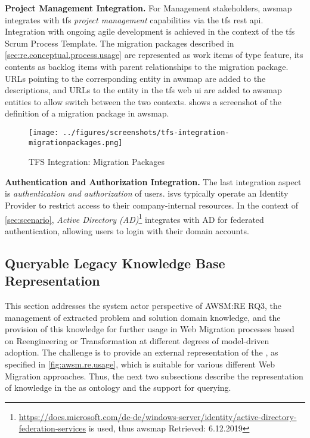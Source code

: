 \textbf{Project Management Integration.} For Management stakeholders, \gls{awsmap} integrates with \gls{tfs} \emph{project management} capabilities via the \gls{tfs} \gls{rest} \gls{api}.
Integration with ongoing agile development is achieved in the context of the \gls{tfs} Scrum Process Template.
The migration packages described in \cref{sec:re.conceptual.process.usage} are represented as work items of type feature, its contents as backlog items with parent relationships to the migration package.
URLs pointing to the corresponding entity in \gls{awsmap} are added to the descriptions, and URLs to the entity in the \gls{tfs} \gls{web} \gls{ui} are added to \gls{awsmap} entities to allow switch between the two contexts.
 shows a screenshot of the definition of a migration package in \gls{awsmap}.
\begin{figure}[h!]
\hypertarget{fig:tfs-integration}{%
\centering
\texttt{[image: ../figures/screenshots/tfs-integration-migrationpackages.png]}
\caption{TFS Integration: Migration Packages}\label{fig:tfs-integration}
}
\end{figure}

\textbf{Authentication and Authorization Integration.} The last integration aspect is \emph{authentication and authorization} of users.
\glspl{isv} typically operate an Identity Provider to restrict access to their company-internal resources.
In the context of \cref{sec:scenario}, \emph{Active Directory (AD)}\footnote{\url{https://docs.microsoft.com/de-de/windows-server/identity/active-directory-federation-services} is used, thus \gls{awsmap} Retrieved: 6.12.2019} integrates with AD for federated authentication, allowing users to login with their domain accounts.

\vspace{-10pt}
\hypertarget{sec:representation}{%
\subsection[Queryable Legacy Knowledge Base Repres.]{Queryable Legacy Knowledge Base Representation}\label{sec:representation}}
\vspace{10pt}

This section addresses the system actor perspective of AWSM:RE RQ3, the management of extracted problem and solution domain knowledge, and the provision of this knowledge for further usage in \gls{Web Migration} processes based on \gls{Reengineering} or \gls{Transformation} at different degrees of model-driven adoption.
The challenge is to provide an external representation of the \awsmknowledgebase, as specified in \cref{fig:awsm.re.usage}, which is suitable for various different \gls{Web Migration} approaches.
Thus, the next two subsections describe the representation of knowledge in the \awsmknowledgebase as ontology and the support for querying.

